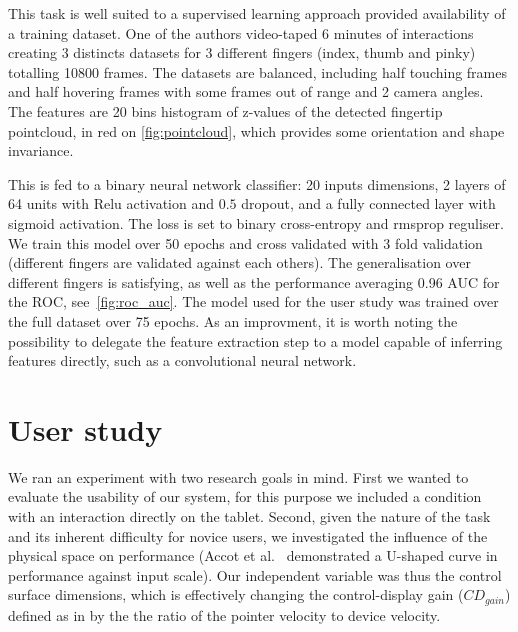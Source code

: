 \documentclass{chi-ext}
\begin{document}
This task is well suited to a supervised learning approach provided availability of a training dataset. One of the authors video-taped 6 minutes of interactions creating 3 distincts datasets for 3 different fingers (index, thumb and pinky) totalling 10800 frames. The datasets are balanced, including half touching frames and half hovering frames with some frames out of range and 2 camera angles. The features are 20 bins histogram of z-values of the detected fingertip pointcloud, in red on \autoref{fig:pointcloud}, which provides some orientation and shape invariance.

This is fed to a binary neural network classifier: 20 inputs dimensions, 2 layers of 64 units with Relu activation and $0.5$ dropout, and a fully connected layer with sigmoid activation. The loss is set to binary cross-entropy and rmsprop reguliser. We train this model over 50 epochs and cross validated with 3 fold validation (different fingers are validated against each others). The generalisation over different fingers is satisfying, as well as the performance averaging 0.96 AUC for the ROC, see~\autoref{fig:roc_auc}. The model used for the user study was trained over the full dataset over 75 epochs. As an improvment, it is worth noting the possibility to delegate the feature extraction step to a model capable of inferring features directly, such as a convolutional neural network.

\section{User study}
We ran an experiment with two research goals in mind. First we wanted to evaluate the usability of our system, for this purpose we included a condition with an interaction directly on the tablet. Second, given the nature of the task and its inherent difficulty for novice users, we investigated the influence of the physical space on performance (Accot et al.~\cite{Accot2001} demonstrated a U-shaped curve in performance against input scale). Our independent variable was thus the control surface dimensions, which is effectively changing the control-display gain ($CD_{gain}$) defined as in \cite{Casiez2008} by the the ratio of the pointer velocity to device velocity.
\end{document}
